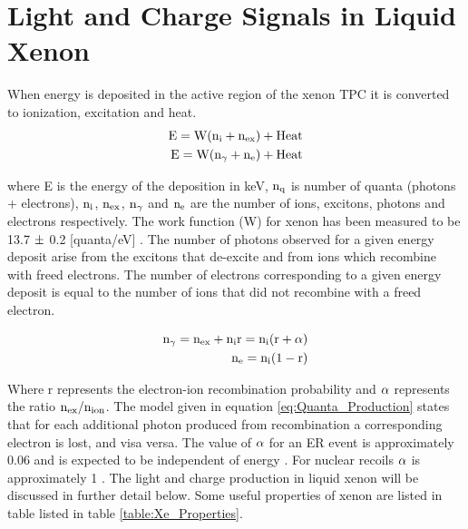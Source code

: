 \newpage

\section{Light and Charge Signals in Liquid Xenon}

When energy is deposited in the active region of the xenon TPC it is converted to ionization, excitation and heat.
\begin{equation}
\begin{split}
\rm E= W (n_i + n_{ex}) + Heat \\
\rm E= W (n_\gamma + n_e) + Heat \\
\label{eq:E_Q}
\end{split}
\end{equation}

\noindent where E is the energy of the deposition in keV, $\rm n_q$ is number of quanta (photons + electrons), $\rm n_i$, $\rm n_{ex}$, $\rm n_\gamma$ and $\rm n_e$ are the number of ions, excitons, photons and electrons respectively. The work function (W) for xenon has been measured to be 13.7 $\rm \pm$ 0.2  [quanta/eV]  \cite{Dahl_Thesis}. The number of photons observed for a given energy deposit arise from the excitons that de-excite and from ions which recombine with freed electrons. The number of electrons corresponding to a given energy deposit is equal to the number of ions that did not recombine with a freed electron. 

\begin{equation}
\begin{split}
\rm  n_\gamma = n_{ex} + n_i r = n_i (r+\alpha) \\
\rm  n_e = n_i (1-r)\\
\label{eq:Quanta_Production}
\end{split}
\end{equation}

\noindent Where r represents the electron-ion recombination probability and $\rm \alpha$ represents the ratio $\rm n_{ex}/n_{ion}$. The model given in equation \ref{eq:Quanta_Production} states that for each additional photon produced from recombination a corresponding electron is lost, and visa versa. The value of $\rm \alpha$ for an ER event is approximately 0.06 and is expected to be independent of energy \cite{alpha_argon} \cite{alpha_xenon} \cite{Dahl_Thesis}. For nuclear recoils $\rm \alpha$ is approximately 1 \cite{Dahl_Thesis}.  The light and charge production in liquid xenon will be discussed in further detail below. Some useful properties of xenon are listed in table listed in table \ref{table:Xe_Properties}. 

